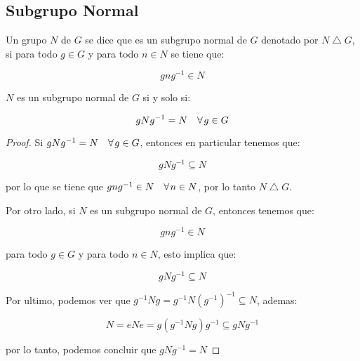     \newpage
    \subsection{Subgrupo Normal}

        \begin{definicion}
            Un grupo $N$ de $G$ se dice que es un subgrupo normal de $G$ denotado por $N \bigtriangleup G$, si para todo $g \in G$ y para todo $n \in N$ se tiene que:

            \begin{equation}
                g n g^{-1} \in N
            \end{equation}
        \end{definicion}

        \begin{lema}
            $N$ es un subgrupo normal de $G$ si y solo si:

            \begin{equation}
                gNg^{-1} = N \quad \forall \mkern2mu g \in G
            \end{equation}
        \end{lema}

        \begin{proof}
            Si $gNg^{-1} = N \quad \forall \mkern2mu g \in G$, entonces en particular tenemos que:

            \begin{equation*}
                gNg^{-1} \subseteq N
            \end{equation*}

            por lo que se tiene que $gng^{-1} \in N \quad \forall \mkern2mu n \in N$, por lo tanto  $N \bigtriangleup G$.

            Por otro lado, si $N$ es un subgrupo normal de $G$, entonces tenemos que:

            \begin{equation*}
                gng^{-1} \in N
            \end{equation*}

            para todo $g \in G$ y para todo $n \in N$, esto implica que:

            \begin{equation*}
                gNg^{-1} \subseteq N
            \end{equation*}

            Por ultimo, podemos ver que $g^{-1} N g = g^{-1} N \left( g^{-1} \right)^{-1} \subseteq N$, ademas:

            \begin{equation*}
                N = e N e = g \left( g^{-1} N g \right) g^{-1} \subseteq g N g^{-1}
            \end{equation*}

            por lo tanto, podemos concluir que $gNg^{-1} = N$
        \end{proof}

